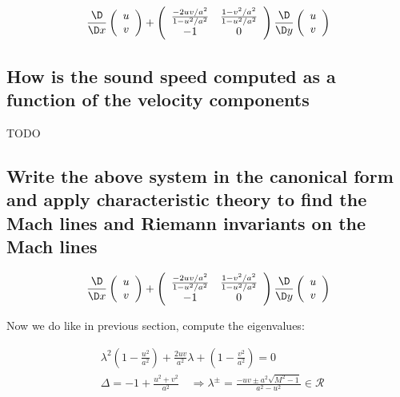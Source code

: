 \documentclass[british,french,11pt, a4paper, openany]{article}
\begin{document}
\begin{equation}
\frac{\D}{\D x} 
\left( 
\begin{array}{c}
u\\
v
\end{array}
\right)
+ 
\left( 
\begin{array}{ccc}
\frac{-2uv/a^2}{1-u^2/a^2} & \frac{1-v^2/a^2}{1-u^2/a^2}\\
-1 & 0
\end{array}
\right)
\frac{\D}{\D y} 
\left( 
\begin{array}{c}
u\\
v
\end{array}
\right)
\end{equation}

\subsection{How is the sound speed computed as a function of the velocity components}

TODO

\subsection{Write the above system in the canonical form and apply characteristic theory to find the Mach lines and Riemann invariants on the Mach lines}

\begin{equation}
\frac{\D}{\D x} 
\left( 
\begin{array}{c}
u\\
v
\end{array}
\right)
+ 
\left( 
\begin{array}{ccc}
\frac{-2uv/a^2}{1-u^2/a^2} & \frac{1-v^2/a^2}{1-u^2/a^2}\\
-1 & 0
\end{array}
\right)
\frac{\D}{\D y} 
\left( 
\begin{array}{c}
u\\
v
\end{array}
\right)
\end{equation}

Now we do like in previous section, compute the eigenvalues:

\begin{equation}
\begin{aligned}
&\lambda ^2 \left( 1-\frac{u^2}{a^2} \right) + \frac{2 uv}{a^2}\lambda + \left(1-\frac{v^2}{a^2} \right) = 0\\
&\Delta = - 1 + \frac{u^2 + v^2}{a^2} \quad \Rightarrow \lambda ^\pm = \frac{-uv\pm a^2 \sqrt{M^2 - 1}}{a^2 - u^2} \in \mathcal{R}
\end{aligned}
\end{equation}	 
\end{document}

